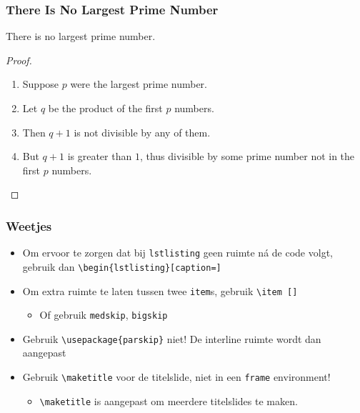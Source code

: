 \documentclass[fleqn,aspectratio=169,dutch,10pt]{beamer}
\begin{document}
\begin{frame}
\frametitle{There Is No Largest Prime Number} 
\begin{theorem}
There is no largest prime number.
\end{theorem} 
\begin{proof}
\begin{enumerate} 
\item<1-| alert@1> Suppose $p$ were the largest prime number. 
\item<2-> Let $q$ be the product of the first $p$ numbers. 
\item<3-> Then $q+1$ is not divisible by any of them. 
\item<1-> But $q + 1$ is greater than $1$, thus divisible by some prime
number not in the first $p$ numbers.
\end{enumerate}
\end{proof}
\end{frame}


\begin{frame}[fragile]
\frametitle{Weetjes}
\begin{itemize}
\item Om ervoor te zorgen dat bij \lstinline|lstlisting| geen ruimte n\'a de code volgt, gebruik dan
\lstinline|\begin{lstlisting}[caption=]|
\item Om extra ruimte te laten tussen twee \lstinline|item|s, gebruik \lstinline|\item []|
\begin{itemize}
\item Of gebruik \lstinline|medskip|, \lstinline|bigskip|
\end{itemize}
\item Gebruik \lstinline|\usepackage{parskip}| niet! De interline ruimte wordt dan aangepast
\item Gebruik \lstinline|\maketitle| voor de titelslide, niet in een \lstinline|frame| environment!
\begin{itemize}
\item \lstinline|\maketitle| is aangepast om meerdere titelslides te maken.
\end{itemize}
\end{itemize}
\end{frame}
\end{document}
